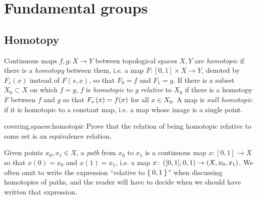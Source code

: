 \chapter{Fundamental groups}\label{chapter:fundamental.groups}

\section{Homotopy}
Continuous maps \(f, g \colon X \to Y\) between topological spaces \(X, Y\) are \emph{homotopic} if there is a \emph{homotopy} between them, i.e. a map \(F \colon [0,1] \times X \to Y\), denoted by \(F_s(x)\) instead of \(F(s,x)\), so that \(F_0=f\) and \(F_1=g\).
If there is a subset \(X_0 \subset X\) on which \(f=g\), \(f\) is \emph{homotopic} to \(g\) \emph{relative} to \(X_0\) if there is a homotopy \(F\) between \(f\) and \(g\) so that \(F_s\left(x\right)=f(x)\) for all \(x \in X_0\).
A map is \emph{null homotopic} if it is homotopic to a constant map, i.e. a map whose image is a single point.
\begin{problem}{covering.spaces:homotopic}
Prove that the relation of being homotopic relative to some set is an equivalence relation.
\end{problem}
Given points \(x_0, x_1 \in X\), a \emph{path} from \(x_0\) to \(x_1\) is a continuous map \(x \colon [0,1] \to X\) so that \(x(0)=x_0\) and \(x(1)=x_1\), i.e. a map \(x \colon \left([0,1],0,1\right) \to \left(X,x_0,x_1\right)\).
We often omit to write the expression ``relative to \(\Set{0,1}\)'' when discussing homotopies of paths, and the reader will have to decide when we should have written that expression.

